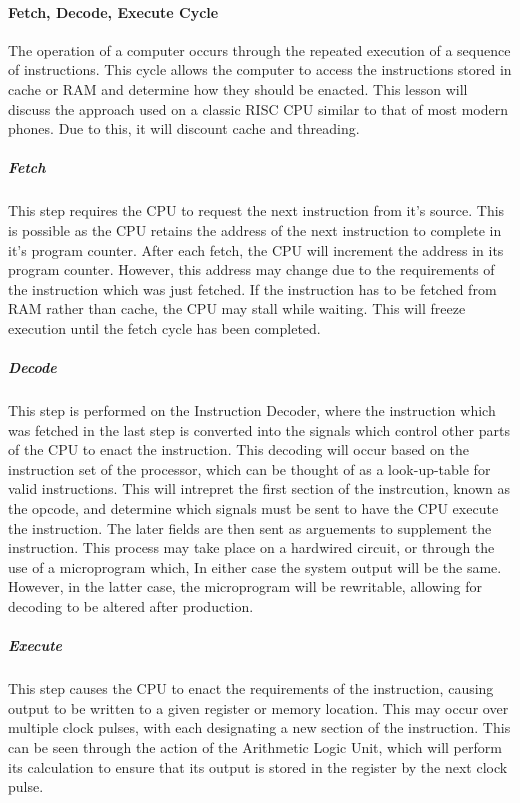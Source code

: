 \documentclass[a4paper,11pt]{article}
\begin{document}
			\paragraph{Fetch, Decode, Execute Cycle}
				The operation of a computer occurs through the repeated execution of a sequence of instructions.
				This cycle allows the computer to access the instructions stored in cache or RAM and determine how they should be enacted. This lesson will discuss the approach used on a classic RISC CPU similar to that of most modern phones. 
				Due to this, it will discount cache and threading. 
				\subparagraph{Fetch}
					This step requires the CPU to request the next instruction from it's source. 
					This is possible as the CPU retains the address of the next instruction to complete in it's program counter. 
					After each fetch, the CPU will increment the address in its program counter. 
					However, this address may change due to the requirements of the instruction which was just fetched. 
					If the instruction has to be fetched from RAM rather than cache, the CPU may stall while waiting.
					This will freeze execution until the fetch cycle has been completed. 
				\subparagraph{Decode}
					This step is performed on the Instruction Decoder, where the instruction which was fetched in the last step is converted into the signals which control other parts of the CPU to enact the instruction. 
					This decoding will occur based on the instruction set of the processor, which can be thought of as a look-up-table for valid instructions. 
					This will intrepret the first section of the instrcution, known as the opcode, and determine which signals must be sent to have the CPU execute the instruction. 
					The later fields are then sent as arguements to supplement the instruction. 
					This process may take place on a hardwired circuit, or through the use of a microprogram which, In either case the system output will be the same. 
					However, in the latter case, the microprogram will be rewritable, allowing for decoding to be altered after production. 
				\subparagraph{Execute}
					This step causes the CPU to enact the requirements of the instruction, causing output to be written to a given register or memory location. 
					This may occur over multiple clock pulses, with each designating a new section of the instruction. 
					This can be seen through the action of the Arithmetic Logic Unit, which will perform its calculation to ensure that its output is stored in the register by the next clock pulse. 
\end{document}
